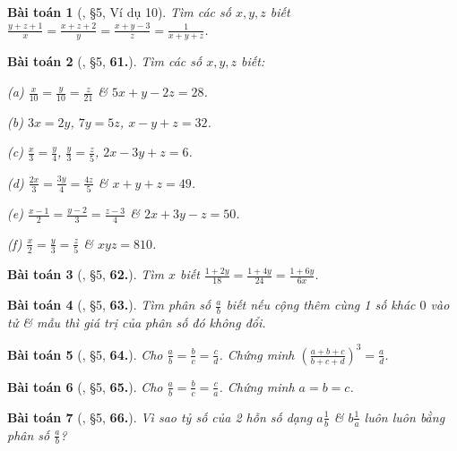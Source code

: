 \documentclass{article}
\numberwithin{equation}{section}
\newtheorem{baitoan}{Bài toán}
\begin{document}
\begin{baitoan}[\cite{Binh_Toan_7_tap_1}, \S5, Ví dụ 10]
	Tìm các số $x,y,z$ biết $\frac{y + z + 1}{x} = \frac{x + z + 2}{y} = \frac{x + y - 3}{z} = \frac{1}{x + y + z}$.
\end{baitoan}

\begin{baitoan}[\cite{Binh_Toan_7_tap_1}, \S5, \textbf{61.}]
	Tìm các số $x,y,z$ biết:
	\begin{enumerate*}
		\item[(a)] $\frac{x}{10} = \frac{y}{10} = \frac{z}{21}$ \& $5x + y - 2z = 28$.
		\item[(b)] $3x = 2y$, $7y = 5z$, $x - y + z = 32$.
		\item[(c)] $\frac{x}{3} = \frac{y}{4}$, $\frac{y}{3} = \frac{z}{5}$, $2x - 3y + z = 6$.
		\item[(d)] $\frac{2x}{3} = \frac{3y}{4} = \frac{4z}{5}$ \& $x + y + z = 49$.
		\item[(e)] $\frac{x - 1}{2} = \frac{y - 2}{3} = \frac{z - 3}{4}$ \& $2x + 3y - z = 50$.
		\item[(f)] $\frac{x}{2} = \frac{y}{3} = \frac{z}{5}$ \& $xyz = 810$.
	\end{enumerate*}
\end{baitoan}

\begin{baitoan}[\cite{Binh_Toan_7_tap_1}, \S5, \textbf{62.}]
	Tìm $x$ biết $\frac{1 + 2y}{18} = \frac{1 + 4y}{24} = \frac{1 + 6y}{6x}$.
\end{baitoan}

\begin{baitoan}[\cite{Binh_Toan_7_tap_1}, \S5, \textbf{63.}]
	Tìm phân số $\frac{a}{b}$ biết nếu cộng thêm cùng 1 số khác $0$ vào tử \& mẫu thì giá trị của phân số đó không đổi.
\end{baitoan}

\begin{baitoan}[\cite{Binh_Toan_7_tap_1}, \S5, \textbf{64.}]
	Cho $\frac{a}{b} = \frac{b}{c} = \frac{c}{d}$. Chứng minh $\left(\frac{a + b + c}{b + c + d}\right)^3 = \frac{a}{d}$.
\end{baitoan}

\begin{baitoan}[\cite{Binh_Toan_7_tap_1}, \S5, \textbf{65.}]
	Cho $\frac{a}{b} = \frac{b}{c} = \frac{c}{a}$. Chứng minh $a = b = c$.
\end{baitoan}

\begin{baitoan}[\cite{Binh_Toan_7_tap_1}, \S5, \textbf{66.}]
	Vì sao tỷ số của 2 hỗn số dạng $a\frac{1}{b}$ \& $b\frac{1}{a}$ luôn luôn bằng phân số $\frac{a}{b}$?
\end{baitoan}
\end{document}
